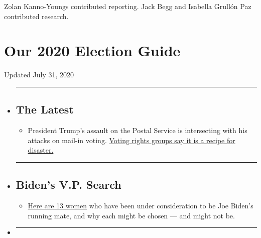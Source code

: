 Zolan Kanno-Youngs contributed reporting. Jack Begg and Isabella Grullón
Paz contributed research.

\hypertarget{our-2020-election-guide}{%
\section{Our 2020 Election Guide}\label{our-2020-election-guide}}

Updated July 31, 2020

\begin{itemize}
\item
  \begin{center}\rule{0.5\linewidth}{\linethickness}\end{center}

  \hypertarget{the-latest}{%
  \subsection{The Latest}\label{the-latest}}

  \begin{itemize}
  \tightlist
  \item
    President Trump's assault on the Postal Service is intersecting with
    his attacks on mail-in voting.
    \href{https://www.nytimes.com/2020/07/31/us/politics/trump-usps-mail-delays.html?action=click\&pgtype=Article\&state=default\&region=BELOW_MAIN_CONTENT\&context=storylines_guide}{Voting
    rights groups say it is a recipe for disaster.}
  \end{itemize}
\item
  \begin{center}\rule{0.5\linewidth}{\linethickness}\end{center}

  \hypertarget{bidens-vp-search}{%
  \subsection{Biden's V.P. Search}\label{bidens-vp-search}}

  \begin{itemize}
  \tightlist
  \item
    \href{https://www.nytimes.com/article/biden-vice-president-2020.html?action=click\&pgtype=Article\&state=default\&region=BELOW_MAIN_CONTENT\&context=storylines_guide}{Here
    are 13 women} who have been under consideration to be Joe Biden's
    running mate, and why each might be chosen --- and might not be.
  \end{itemize}
\item
  \begin{center}\rule{0.5\linewidth}{\linethickness}\end{center}


\end{itemize}
